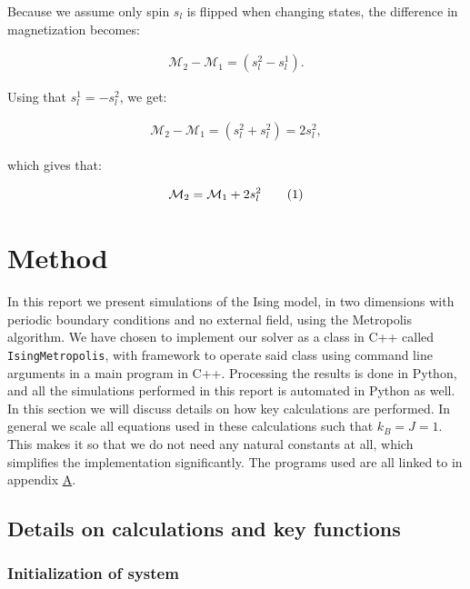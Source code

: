 \documentclass[reprint,english,notitlepage]{revtex4-1}  %
\newcommand\numberthis{\addtocounter{equation}{1}\tag{\theequation}}
\begin{document}
Because we assume only spin \(s_{l}\) is flipped when changing states, the difference in magnetization becomes:

\begin{align*}
 	\mathcal{M}_2 - \mathcal{M}_{1} = \left(s_{l}^{2} - s_{l}^{1}\right).
\end{align*} 

Using that \(s_{l}^{1} = - s_{l}^{2}\), we get:

\begin{align*}
	\mathcal{M}_2 - \mathcal{M}_{1} = \left(s_{l}^{2} + s_{l}^{2}\right) = 2s_{l}^{2},
\end{align*}

which gives that:

\begin{align*}
	\mathcal{M}_2 = \mathcal{M}_1 + 2s_{l}^{2} \numberthis \label{eq:delta_m}
\end{align*}


\newpage

\section{Method} \label{sec:III}

In this report we present simulations of the Ising model, in two dimensions with periodic boundary conditions and no external field, using the Metropolis algorithm. We have chosen to implement our solver as a class in C++ called \verb+IsingMetropolis+, with framework to operate said class using command line arguments in a main program in C++. Processing the results is done in Python, and all the simulations performed in this report is automated in Python as well. In this section we will discuss details on how key calculations are performed. In general we scale all equations used in these calculations such that $k_B = J = 1$. This makes it so that we do not need any natural constants at all, which simplifies the implementation significantly. The programs used are all linked to in appendix \hyperref[A]{A}.

\subsection{Details on calculations and key functions} \label{sec:III:a}

\subsubsection{Initialization of system} \label{sec:III:a:i}
\end{document}
